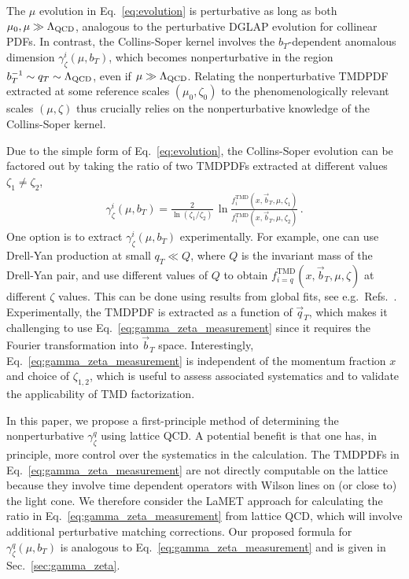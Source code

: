 \documentclass[prd,aps,twocolumn,bibnotes,nofootinbib,preprintnumbers,floatfix]{revtex4-1}
\DeclareRobustCommand{\eq}[1]{Eq.~\eqref{eq:#1}}
\DeclareRobustCommand{\sec}[1]{Sec.~\ref{sec:#1}}
\DeclareRobustCommand{\mycites}[1]{Refs.~\cite{#1}}
\newcommand{\LQCD}{\Lambda_{\rm QCD}}
\newcommand{\bt}{\vec b_T}
\newcommand\TMD{\mathrm{TMD}}
\begin{document}
The $\mu$ evolution in \eq{evolution} is perturbative as long as both $\mu_0, \mu \gg \LQCD$, analogous to the perturbative DGLAP evolution for collinear PDFs.
In contrast, the Collins-Soper kernel involves the $b_T$-dependent anomalous dimension $\gamma_\zeta^i(\mu,b_T)$,
which becomes nonperturbative in the region $b_T^{-1} \sim q_T \sim \LQCD$, even if $\mu \gg \LQCD$. Relating the nonperturbative TMDPDF extracted at some reference scales $(\mu_0,\zeta_0)$ to the phenomenologically relevant scales $(\mu,\zeta)$ thus crucially relies on the nonperturbative knowledge of the Collins-Soper kernel.


Due to the simple form of \eq{evolution}, the Collins-Soper evolution can be factored out by taking the ratio of two TMDPDFs extracted at different values $\zeta_1 \ne \zeta_2$,
\begin{align} \label{eq:gamma_zeta_measurement}
 \gamma_\zeta^i(\mu,b_T)
 = \frac{2}{\ln(\zeta_1/\zeta_2)} \,
  \ln\frac{f^\TMD_i(x, \bt, \mu, \zeta_1)}{f^\TMD_i(x, \bt, \mu, \zeta_2)}
\,.\end{align}
One option is to extract $\gamma_\zeta^{i}(\mu,b_T)$ experimentally. For example, one can use Drell-Yan production at small $q_T\ll Q$, where $Q$ is the invariant mass of the Drell-Yan pair, and use different values of $Q$ to obtain $f^\TMD_{i=q}(x, \bt, \mu, \zeta)$ at different $\zeta$ values. This can be done using results from global fits, see e.g.\ \mycites{Bacchetta:2017gcc,Scimemi:2017etj}. Experimentally, the TMDPDF is extracted as a function of $\vec q_T$, which makes it challenging to use \eq{gamma_zeta_measurement} since it requires the Fourier transformation into $\vec b_T$ space. 
Interestingly, \eq{gamma_zeta_measurement} is independent of the momentum fraction $x$ and choice of $\zeta_{1,2}$,
which is useful to assess associated systematics and to validate the applicability of TMD factorization.
  

In this paper, we propose a first-principle method of determining the nonperturbative $\gamma_\zeta^q$ using lattice QCD.
A potential benefit is that one has, in principle, more control over the systematics in the calculation.
The TMDPDFs in \eq{gamma_zeta_measurement} are not directly computable on the lattice because they involve time dependent operators with Wilson lines on (or close to) the light cone. We therefore consider the LaMET approach for calculating the ratio in \eq{gamma_zeta_measurement} from lattice QCD, which will involve additional perturbative matching corrections. Our proposed formula for  $\gamma_\zeta^q(\mu,b_T)$ is analogous to \eq{gamma_zeta_measurement} and is given in \sec{gamma_zeta}.
\end{document}
